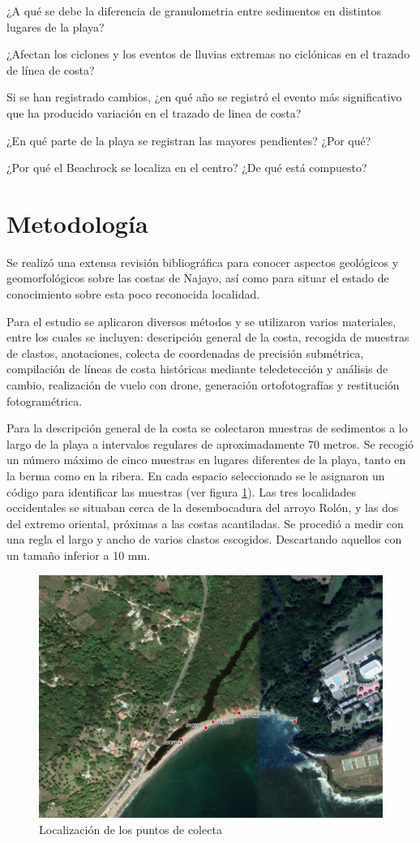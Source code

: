 \documentclass[11pt,]{article}
\begin{document}
¿A qué se debe la diferencia de granulometria entre sedimentos en
distintos lugares de la playa?

¿Afectan los ciclones y los eventos de lluvias extremas no ciclónicas en
el trazado de línea de costa?

Si se han registrado cambios, ¿en qué año se registró el evento más
significativo que ha producido variación en el trazado de linea de
costa?

¿En qué parte de la playa se registran las mayores pendientes? ¿Por qué?

¿Por qué el Beachrock se localiza en el centro? ¿De qué está compuesto?

\section{Metodología}\label{metodologuxeda}

Se realizó una extensa revisión bibliográfica para conocer aspectos
geológicos y geomorfológicos sobre las costas de Najayo, así como para
situar el estado de conocimiento sobre esta poco reconocida localidad.

Para el estudio se aplicaron diversos métodos y se utilizaron varios
materiales, entre los cuales se incluyen: descripción general de la
costa, recogida de muestras de clastos, anotaciones, colecta de
coordenadas de precisión submétrica, compilación de líneas de costa
históricas mediante teledetección y análisis de cambio, realización de
vuelo con drone, generación ortofotografías y restitución
fotogramétrica.

Para la descripción general de la costa se colectaron muestras de
sedimentos a lo largo de la playa a intervalos regulares de
aproximadamente 70 metros. Se recogió un número máximo de cinco muestras
en lugares diferentes de la playa, tanto en la berma como en la ribera.
En cada espacio seleccionado se le asignaron un código para identificar
las muestras (ver figura \ref{mismuestrass}). Las tres localidades
occidentales se situaban cerca de la desembocadura del arroyo Rolón, y
las dos del extremo oriental, próximas a las costas acantiladas. Se
procedió a medir con una regla el largo y ancho de varios clastos
escogidos. Descartando aquellos con un tamaño inferior a 10 mm.

\begin{figure}
\centering
\includegraphics[height=3.12500in]{MUESTRASS.jpg}
\caption{Localización de los puntos de colecta \label{mismuestrass}}
\end{figure}
\end{document}
